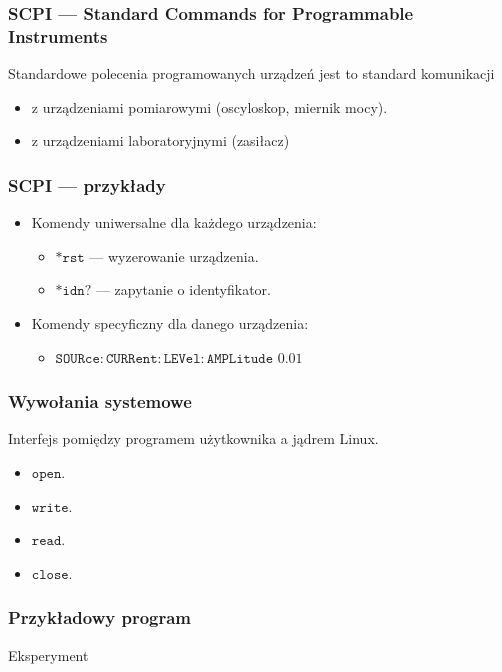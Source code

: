 \documentclass[xcolor={dvipsnames,table}]{beamer}
\begin{document}
\begin{frame}
\frametitle{SCPI --- Standard Commands for Programmable Instruments}
Standardowe polecenia programowanych urządzeń jest to standard komunikacji
\begin{itemize}
\item z urządzeniami pomiarowymi (oscyloskop, miernik mocy).
\item z urządzeniami laboratoryjnymi (zasiłacz)
\end{itemize} 
\end{frame}

\begin{frame}
\frametitle{SCPI --- przykłady}
\begin{itemize}
\item Komendy uniwersalne dla każdego urządzenia:
\begin{itemize}
\item $\mathtt{*rst}$ --- wyzerowanie urządzenia.
\item $\mathtt{*idn?}$ --- zapytanie o identyfikator.
\end{itemize}
\item Komendy specyficzny dla danego urządzenia:
\begin{itemize}
\item $\mathtt{SOURce:CURRent:LEVel:AMPLitude}$  $\mathtt{0.01}$
\end{itemize}
\end{itemize}
\end{frame}

\begin{frame}
\frametitle{Wywołania systemowe}
Interfejs pomiędzy programem użytkownika a jądrem Linux.
\begin{itemize}
\item $\mathtt{open}$.
\item $\mathtt{write}$.
\item $\mathtt{read}$.
\item $\mathtt{close}$.
\end{itemize}
\end{frame}

\begin{frame}
\frametitle{Przykładowy program}

\end{frame}

\begin{frame}
\begin{Huge}
\begin{center}
Eksperyment
\end{center}
\end{Huge}
\end{frame}
\end{document}
